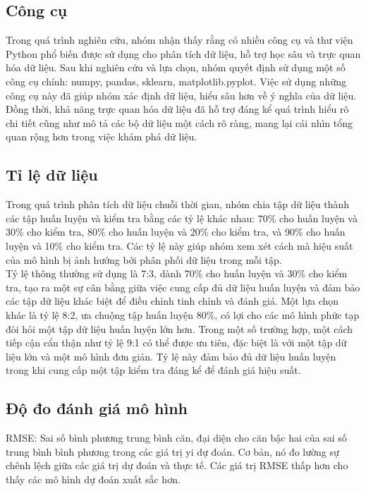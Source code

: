 \documentclass[conference]{IEEEtran}
\begin{document}
\subsection{Công cụ}
Trong quá trình nghiên cứu, nhóm nhận thấy rằng có nhiều công cụ và thư viện Python phổ biến được sử dụng cho phân tích dữ liệu, hỗ trợ học sâu và trực quan hóa dữ liệu. Sau khi nghiên cứu và lựa chọn, nhóm quyết định sử dụng một số công cụ chính: numpy, pandas, sklearn, matplotlib.pyplot. Việc sử dụng những công cụ này đã giúp nhóm xác định dữ liệu, hiểu sâu hơn về ý nghĩa của dữ liệu. Đồng thời, khả năng trực quan hóa dữ liệu đã hỗ trợ đáng kể quá trình hiểu rõ chi tiết cũng như mô tả các bộ dữ liệu một cách rõ ràng, mang lại cái nhìn tổng quan rộng hơn trong việc khám phá dữ liệu.

\subsection{Tỉ lệ dữ liệu}
Trong quá trình phân tích dữ liệu chuỗi thời gian, nhóm chia tập dữ liệu thành các tập huấn luyện và kiểm tra bằng các tỷ lệ khác nhau: 70\% cho huấn luyện và 30\% cho kiểm tra, 80\% cho huấn luyện và 20\% cho kiểm tra, và 90\% cho huấn luyện và 10\% cho kiểm tra. Các tỷ lệ này giúp nhóm xem xét cách mà hiệu suất của mô hình bị ảnh hưởng bởi phân phối dữ liệu trong mỗi tập.\\

Tỷ lệ thông thường sử dụng là 7:3, dành 70\% cho huấn luyện và 30\% cho kiểm tra, tạo ra một sự cân bằng giữa việc cung cấp đủ dữ liệu huấn luyện và đảm bảo các tập dữ liệu khác biệt để điều chỉnh tinh chỉnh và đánh giá. Một lựa chọn khác là tỷ lệ 8:2, ưa chuộng tập huấn luyện 80\%, có lợi cho các mô hình phức tạp đòi hỏi một tập dữ liệu huấn luyện lớn hơn. Trong một số trường hợp, một cách tiếp cận cẩn thận như tỷ lệ 9:1 có thể được ưu tiên, đặc biệt là với một tập dữ liệu lớn và một mô hình đơn giản. Tỷ lệ này đảm bảo đủ dữ liệu huấn luyện trong khi cung cấp một tập kiểm tra đáng kể để đánh giá hiệu suất.

\subsection{Độ đo đánh giá mô hình}
RMSE: Sai số bình phương trung bình căn, đại diện cho căn bậc hai của sai số trung bình bình phương trong các giá trị yi dự đoán. Cơ bản, nó đo lường sự chênh lệch giữa các giá trị dự đoán và thực tế. Các giá trị RMSE thấp hơn cho thấy các mô hình dự đoán xuất sắc hơn.\\
\end{document}
